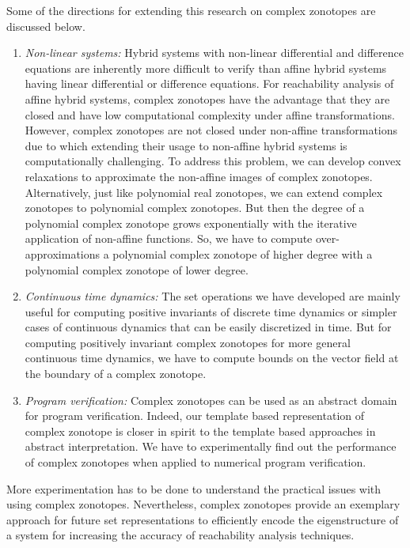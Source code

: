 Some of the directions for extending this research on complex
zonotopes are discussed below.
%
\begin{enumerate}
\item \emph{Non-linear systems: } Hybrid systems with non-linear
  differential and difference equations are inherently more difficult
  to verify than affine hybrid systems having linear differential or
  difference equations.  For reachability analysis of affine hybrid
  systems, complex zonotopes have the advantage that they are closed
  and have low computational complexity under affine transformations.
  However, complex zonotopes are not closed under non-affine
  transformations due to which extending their usage to non-affine
  hybrid systems is computationally challenging.  To address this
  problem, we can develop convex relaxations to approximate the
  non-affine images of complex zonotopes.  Alternatively, just like
  polynomial real zonotopes, we can extend complex zonotopes to
  polynomial complex zonotopes.  But then the degree of a polynomial
  complex zonotope grows exponentially with the iterative application
  of non-affine functions.  So, we have to compute
  over-approximations a polynomial complex zonotope of higher degree
  with a polynomial complex zonotope of lower degree.
\item \emph{Continuous time dynamics: } The set operations we have
  developed are mainly useful for computing positive invariants of
  discrete time dynamics or simpler cases of continuous dynamics that
  can be easily discretized in time.  But for computing positively
  invariant complex zonotopes for more general continuous time
  dynamics, we have to compute bounds on the vector field
  at the boundary of a complex zonotope.
\item \emph{Program verification:  }  Complex zonotopes can be used as
  an abstract domain for program verification.  Indeed, our template
  based representation of complex zonotope is closer in spirit to the
  template based approaches in abstract interpretation.  We have to
  experimentally find out the performance of complex zonotopes when
  applied to numerical program verification.
\end{enumerate}
%
More experimentation has to be done to understand the practical issues
with using complex zonotopes.  Nevertheless, complex zonotopes provide
an exemplary approach for future set representations to efficiently
encode the eigenstructure of a system for increasing the accuracy of
reachability analysis techniques.
